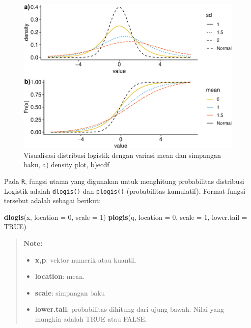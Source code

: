 \documentclass[]{book}
\newenvironment{Shaded}{\begin{snugshade}}{\end{snugshade}}
\newcommand{\KeywordTok}[1]{\textcolor[rgb]{0.13,0.29,0.53}{\textbf{#1}}}
\newcommand{\DataTypeTok}[1]{\textcolor[rgb]{0.13,0.29,0.53}{#1}}
\newcommand{\DecValTok}[1]{\textcolor[rgb]{0.00,0.00,0.81}{#1}}
\newcommand{\OtherTok}[1]{\textcolor[rgb]{0.56,0.35,0.01}{#1}}
\newcommand{\NormalTok}[1]{#1}
\providecommand{\tightlist}{%
  \setlength{\itemsep}{0pt}\setlength{\parskip}{0pt}}
\begin{document}
\begin{figure}

{\centering \includegraphics[width=0.9\linewidth]{EnvStat_files/figure-latex/dlogistikvis-1} 

}

\caption{Visualisasi distribusi logistik dengan variasi mean dan simpangan baku, a) density plot, b)ecdf}\label{fig:dlogistikvis}
\end{figure}

Pada \texttt{R}, fungsi utama yang digunakan untuk menghitung
probabilitas distribusi Logistik adalah \texttt{dlogis()} dan
\texttt{plogis()} (probabilitas kumulatif). Format fungsi tersebut
adalah sebagai berikut:

\begin{Shaded}
\begin{Highlighting}[]
\KeywordTok{dlogis}\NormalTok{(x, }\DataTypeTok{location =} \DecValTok{0}\NormalTok{, }\DataTypeTok{scale =} \DecValTok{1}\NormalTok{)}
\KeywordTok{plogis}\NormalTok{(q, }\DataTypeTok{location =} \DecValTok{0}\NormalTok{, }\DataTypeTok{scale =} \DecValTok{1}\NormalTok{, }\DataTypeTok{lower.tail =} \OtherTok{TRUE}\NormalTok{)}
\end{Highlighting}
\end{Shaded}

\begin{quote}
\textbf{Note: }

\begin{itemize}
\tightlist
\item
  \textbf{x,p}: vektor numerik atau kuantil.
\item
  \textbf{location}: mean.
\item
  \textbf{scale}: simpangan baku
\item
  \textbf{lower.tail}: probabilitas dihitung dari ujung bawah. Nilai
  yang mungkin adalah TRUE atau FALSE.
\end{itemize}
\end{quote}
\end{document}
